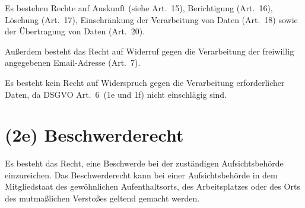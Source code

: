 \documentclass[10pt,a4paper]{scrartcl}
\begin{document}
Es bestehen Rechte auf Auskunft (siehe Art.~15),
Berichtigung (Art.~16),
Löschung (Art.~17),
Einschränkung der Verarbeitung von Daten (Art.~18)
sowie der Übertragung von Daten (Art.~20).

Außerdem besteht das Recht auf Widerruf gegen die Verarbeitung der freiwillig angegebenen Email-Adresse (Art.~7).

Es besteht kein Recht auf Widerspruch gegen die Verarbeitung erforderlicher Daten,
da DSGVO Art.~6~(1e und 1f) nicht einschlägig sind.

\section*{(2e) Beschwerderecht}

Es besteht das Recht, eine Beschwerde bei der zuständigen Aufsichtsbehörde einzureichen.
Das Beschwerderecht kann bei einer Aufsichtsbehörde in dem Mitgliedstaat
des gewöhnlichen Aufenthaltsorts,
des Arbeitsplatzes oder
des Orts des mutmaßlichen Verstoßes geltend gemacht werden.
\end{document}
